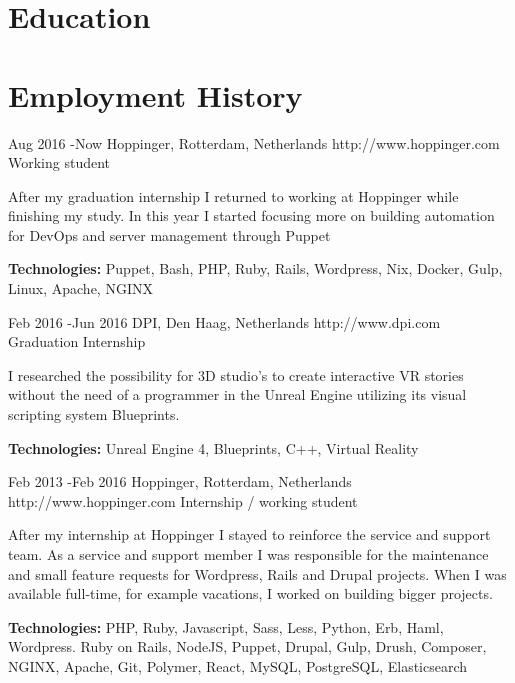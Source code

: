 \documentclass[10pt]{article} %
\begin{document}

\section{Education}





\section{Employment History}

\job
{Aug 2016 -}{Now}
{Hoppinger, Rotterdam, Netherlands}
{http://www.hoppinger.com}
{Working student}
{After my graduation internship I returned to working at Hoppinger while finishing my study. In this year I started focusing more on building automation for DevOps and server management through Puppet

\rule{0mm}{5mm}\textbf{Technologies:} Puppet, Bash, PHP, Ruby, Rails, Wordpress, Nix, Docker, Gulp, Linux, Apache, NGINX }

\job
{Feb 2016 -}{Jun 2016}
{DPI, Den Haag, Netherlands}
{http://www.dpi.com}
{Graduation Internship}
{I researched the possibility for 3D studio's to create interactive VR stories without the need of a programmer in the Unreal Engine utilizing its visual scripting system Blueprints.\\
\rule{0mm}{5mm}\textbf{Technologies:} Unreal Engine 4, Blueprints, C++, Virtual Reality}

\newpage 
\job
{Feb 2013 -}{Feb 2016}
{Hoppinger, Rotterdam, Netherlands}
{http://www.hoppinger.com}
{Internship / working student}
{After my internship at Hoppinger I stayed to reinforce the service and support team. As a service and support member I was responsible for the maintenance and small feature requests for Wordpress, Rails and Drupal projects. When I was available full-time, for example vacations, I worked on building bigger projects.

\rule{0mm}{5mm}\textbf{Technologies:} PHP, Ruby, Javascript, Sass, Less, Python, Erb, Haml, Wordpress. Ruby on Rails, NodeJS, Puppet, Drupal, Gulp, Drush, Composer, NGINX, Apache, Git, Polymer, React, MySQL, PostgreSQL, Elasticsearch
}
\end{document}
